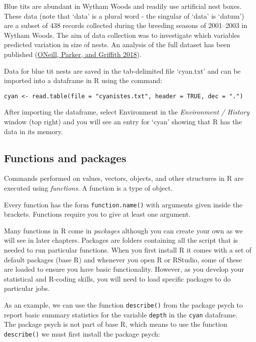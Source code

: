 \documentclass[
]{book}
\begin{document}
Blue tits are abundant in Wytham Woods and readily use artificial nest
boxes. These data (note that `data' is a plural word - the singular of
`data' is `datum') are a subset of 438 records collected during the
breeding seasons of 2001--2003 in Wytham Woods. The aim of data
collection was to investigate which variables predicted variation in
size of nests. An analysis of the full dataset has been published
(\protect\hyperlink{ref-O_Neill_2018}{ONeill, Parker, and Griffith
2018}).

Data for blue tit nests are saved in the tab-delimited file `cyan.txt'
and can be imported into a dataframe in R using the command:

\texttt{cyan\ \textless{}-\ read.table(file\ =\ "cyanistes.txt",\ header\ =\ TRUE,\ dec\ =\ ".")}

After importing the dataframe, select Environment in the
\emph{Environment / History} window (top right) and you will see an
entry for `cyan' showing that R has the data in its memory.

\hypertarget{functions}{%
\subsection{Functions and packages}\label{functions}}

Commands performed on values, vectors, objects, and other structures in
R are executed using \emph{functions}. A function is a type of object.

Every function has the form \texttt{function.name()} with arguments
given inside the brackets. Functions require you to give at least one
argument.

Many functions in R come in \emph{packages} although you can create your
own as we will see in later chapters. Packages are folders containing
all the script that is needed to run particular functions. When you
first install R it comes with a set of default packages (base R) and
whenever you open R or RStudio, some of these are loaded to ensure you
have basic functionality. However, as you develop your statistical and
R-coding skills, you will need to load specific packages to do
particular jobs.

As an example, we can use the function \texttt{describe()} from the
package psych to report basic summary statistics for the variable
\texttt{depth} in the \texttt{cyan} dataframe. The package psych is not
part of base R, which means to use the function \texttt{describe()} we
must first install the package psych:
\end{document}
